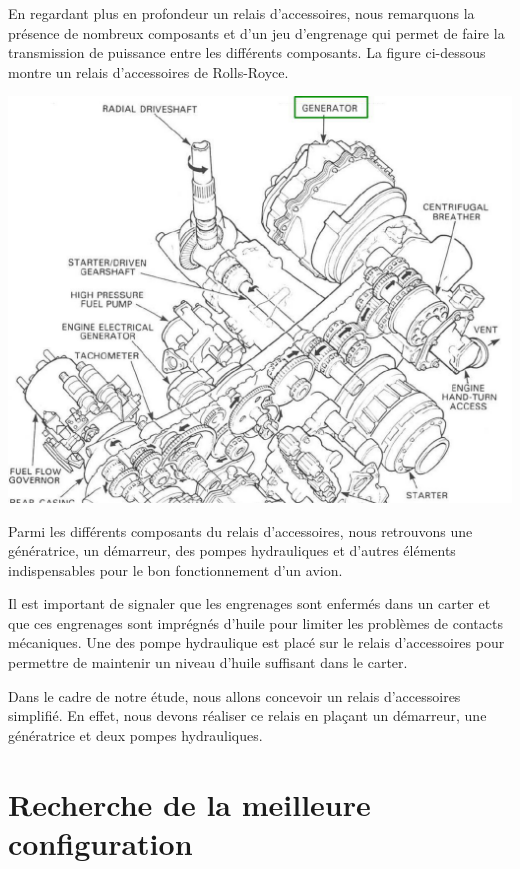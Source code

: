 \documentclass{config}
\begin{document}
\begin{spacing}{1.2}
\newpage
En regardant plus en profondeur un relais d'accessoires, nous remarquons la présence de nombreux composants et d'un jeu d'engrenage qui permet de faire la transmission de puissance entre les différents composants. La figure ci-dessous montre un relais d'accessoires de Rolls-Royce.
\begin{center}
\includegraphics[scale=0.6]{relai_accessoires.jpg}
\end{center}

Parmi les différents composants du relais d'accessoires, nous retrouvons une génératrice, un démarreur, des pompes hydrauliques et d'autres éléments indispensables pour le bon fonctionnement d'un avion. 

Il est important de signaler que les engrenages sont enfermés dans un carter et que ces engrenages sont imprégnés d'huile pour limiter les problèmes de contacts mécaniques. Une des pompe hydraulique est placé sur le relais d'accessoires pour permettre de maintenir un niveau d'huile suffisant dans le carter.

Dans le cadre de notre étude, nous allons concevoir un relais d'accessoires simplifié. En effet, nous devons réaliser ce relais en plaçant un démarreur, une génératrice et deux pompes hydrauliques.


\newpage
\section{Recherche de la meilleure configuration}


\end{spacing}
\end{document}
